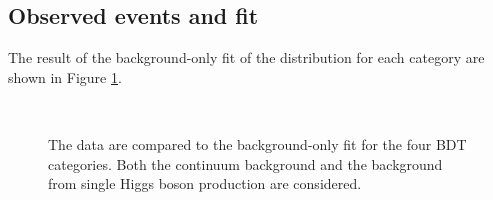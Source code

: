 \subsection{Observed events and \myy fit}
\label{HHyybb:Results:Fit}
The result of the background-only fit of the \myy distribution for each category are shown in Figure \ref{fig:HHyybb:Results:Fit:myy}. 
\begin{figure}[htbp]
    \centering
     \\
    \caption{The data are compared to the background-only fit for the four BDT categories. Both the continuum background and the background from single Higgs boson production are considered.}
    \label{fig:HHyybb:Results:Fit:myy}
\end{figure}
